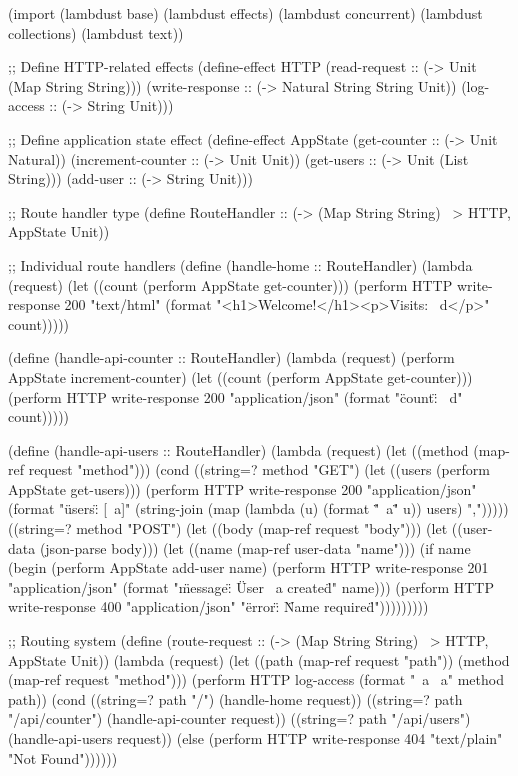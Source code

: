 \begin{example}
\begin{lambdustcode}
(import (lambdust base)
        (lambdust effects)
        (lambdust concurrent)
        (lambdust collections)
        (lambdust text))

;; Define HTTP-related effects
(define-effect HTTP
  (read-request :: (-> Unit (Map String String)))
  (write-response :: (-> Natural String String Unit))
  (log-access :: (-> String Unit)))

;; Define application state effect
(define-effect AppState
  (get-counter :: (-> Unit Natural))
  (increment-counter :: (-> Unit Unit))
  (get-users :: (-> Unit (List String)))
  (add-user :: (-> String Unit)))

;; Route handler type
(define RouteHandler :: (-> (Map String String) ~> {HTTP, AppState} Unit))

;; Individual route handlers
(define (handle-home :: RouteHandler)
  (lambda (request)
    (let ((count (perform AppState get-counter)))
      (perform HTTP write-response 200 "text/html"
        (format "<h1>Welcome!</h1><p>Visits: ~d</p>" count)))))

(define (handle-api-counter :: RouteHandler)
  (lambda (request)
    (perform AppState increment-counter)
    (let ((count (perform AppState get-counter)))
      (perform HTTP write-response 200 "application/json"
        (format "{\"count\": ~d}" count)))))

(define (handle-api-users :: RouteHandler)
  (lambda (request)
    (let ((method (map-ref request "method")))
      (cond
        ((string=? method "GET")
         (let ((users (perform AppState get-users)))
           (perform HTTP write-response 200 "application/json"
             (format "{\"users\": [~a]}" 
                    (string-join (map (lambda (u) (format "\"~a\"" u)) users) ",")))))
        ((string=? method "POST")
         (let ((body (map-ref request "body")))
           (let ((user-data (json-parse body)))
             (let ((name (map-ref user-data "name")))
               (if name
                   (begin
                     (perform AppState add-user name)
                     (perform HTTP write-response 201 "application/json" 
                       (format "{\"message\": \"User ~a created\"}" name)))
                   (perform HTTP write-response 400 "application/json"
                     "{\"error\": \"Name required\"}")))))))))

;; Routing system
(define (route-request :: (-> (Map String String) ~> {HTTP, AppState} Unit))
  (lambda (request)
    (let ((path (map-ref request "path"))
          (method (map-ref request "method")))
      (perform HTTP log-access (format "~a ~a" method path))
      (cond
        ((string=? path "/") (handle-home request))
        ((string=? path "/api/counter") (handle-api-counter request))
        ((string=? path "/api/users") (handle-api-users request))
        (else 
         (perform HTTP write-response 404 "text/plain" "Not Found"))))))


\end{lambdustcode}
\end{example}
